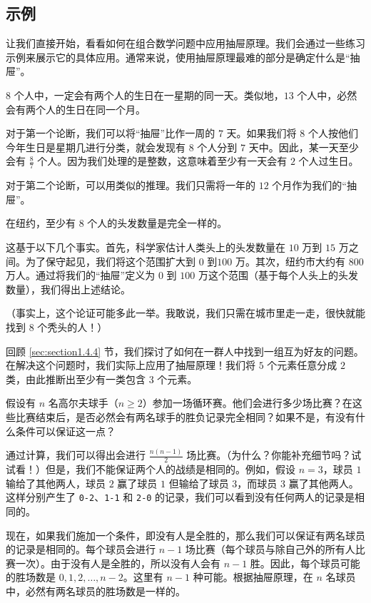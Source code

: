 
\subsection{示例}

让我们直接开始，看看如何在组合数学问题中应用抽屉原理。我们会通过一些练习示例来展示它的具体应用。通常来说，使用抽屉原理最难的部分是确定什么是``抽屉''。

\begin{example}
    $8$ 个人中，一定会有两个人的生日在一星期的同一天。类似地，$13$ 个人中，必然会有两个人的生日在同一个月。

    对于第一个论断，我们可以将``抽屉''比作一周的 $7$ 天。如果我们将 $8$ 个人按他们今年生日是星期几进行分类，就会发现有 $8$ 个人分到 $7$ 天中。因此，某一天至少会有 $\frac{8}{7}$ 个人。因为我们处理的是整数，这意味着至少有一天会有 $2$ 个人过生日。

    对于第二个论断，可以用类似的推理。我们只需将一年的 $12$ 个月作为我们的``抽屉''。
\end{example}

\begin{example}
    在纽约，至少有 $8$ 个人的头发数量是完全一样的。

    这基于以下几个事实。首先，科学家估计人类头上的头发数量在 $10$ 万到 $15$ 万之间。为了保守起见，我们将这个范围扩大到 $0$ 到$100$ 万。其次，纽约市大约有 $800$ 万人。通过将我们的``抽屉''定义为 $0$ 到 $100$ 万这个范围（基于每个人头上的头发数量），我们得出上述结论。

    （事实上，这个论证可能多此一举。我敢说，我们只需在城市里走一走，很快就能找到 $8$ 个秃头的人！）
\end{example}

\begin{example}
    回顾 \ref{sec:section1.4.4} 节，我们探讨了如何在一群人中找到一组互为好友的问题。在解决这个问题时，我们实际上应用了抽屉原理！我们将 $5$ 个元素任意分成 $2$ 类，由此推断出至少有一类包含 $3$ 个元素。
\end{example}

\begin{example}
    假设有 $n$ 名高尔夫球手（$n \ge 2$）参加一场循环赛。他们会进行多少场比赛？在这些比赛结束后，是否必然会有两名球手的胜负记录完全相同？如果不是，有没有什么条件可以保证这一点？

    通过计算，我们可以得出会进行 $\frac{n(n-1)}{2}$ 场比赛。（为什么？你能补充细节吗？试试看！）但是，我们不能保证两个人的战绩是相同的。例如，假设 $n = 3$，球员 $1$ 输给了其他两人，球员 $2$ 赢了球员 $1$ 但输给了球员 $3$，而球员 $3$ 赢了其他两人。这样分别产生了 \verb|0-2|、\verb|1-1| 和 \verb|2-0| 的记录，我们可以看到没有任何两人的记录是相同的。

    现在，如果我们施加一个条件，即没有人是全胜的，那么我们可以保证有两名球员的记录是相同的。每个球员会进行 $n-1$ 场比赛（每个球员与除自己外的所有人比赛一次）。由于没有人是全胜的，所以没有人会有 $n-1$ 胜。因此，每个球员可能的胜场数是 $0,1,2, \dots, n-2$。这里有 $n-1$ 种可能。根据抽屉原理，在 $n$ 名球员中，必然有两名球员的胜场数是一样的。
\end{example}

